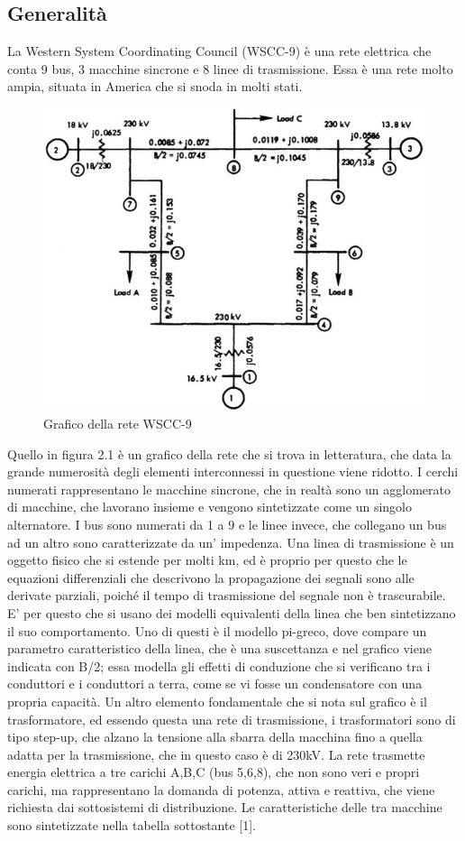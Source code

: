 \documentclass[Lau,noexaminfo]{sapthesis}
\begin{document}
	\subsection{Generalità}
	La Western System Coordinating Council (WSCC-9) è una rete elettrica che conta 9 bus, 3 macchine sincrone e 8 linee di trasmissione. Essa è una rete molto ampia, situata in America che si snoda in molti stati.
	\begin{figure}
		\centering
		\includegraphics[height=0.5\textheight]{WSCC_line}
		\caption{Grafico della rete WSCC-9}
	\end{figure}
	Quello in figura 2.1 è un grafico della rete che si trova in letteratura, che data la grande numerosità degli elementi interconnessi in questione viene ridotto. I cerchi numerati rappresentano le macchine sincrone, che in realtà sono un agglomerato di macchine, che lavorano insieme e vengono sintetizzate come un singolo alternatore. I bus sono numerati da 1 a 9 e le linee invece, che collegano un bus ad un altro sono caratterizzate da un' impedenza. Una linea di trasmissione è un oggetto fisico che si estende per molti km, ed è proprio per questo che le equazioni differenziali che descrivono la propagazione dei segnali sono alle derivate parziali, poiché il tempo di trasmissione del segnale non è trascurabile. E' per questo che si usano dei modelli equivalenti della linea che ben sintetizzano il suo comportamento. Uno di questi è il modello pi-greco, dove compare un parametro caratteristico della linea, che è una suscettanza e nel grafico viene indicata con B/2; essa modella gli effetti di conduzione che si verificano tra i conduttori e i conduttori a terra, come se vi fosse un condensatore con una propria capacità. Un altro elemento fondamentale che si nota sul grafico è il trasformatore, ed essendo questa una rete di trasmissione, i trasformatori sono di tipo step-up, che alzano la tensione alla sbarra della macchina fino a quella adatta per la trasmissione, che in questo caso è di 230kV. La rete trasmette energia elettrica a tre carichi A,B,C (bus 5,6,8), che non sono veri e propri carichi, ma rappresentano la domanda di potenza, attiva e reattiva, che viene richiesta dai sottosistemi di distribuzione. Le caratteristiche delle tra macchine sono sintetizzate nella tabella sottostante [1].\\\\
\end{document}
